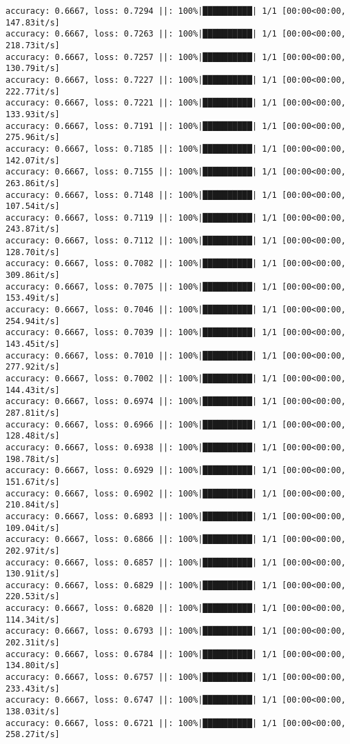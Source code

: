 \documentclass[
]{article}
\begin{document}
\begin{verbatim}
accuracy: 0.6667, loss: 0.7294 ||: 100%|██████████| 1/1 [00:00<00:00, 147.83it/s]
accuracy: 0.6667, loss: 0.7263 ||: 100%|██████████| 1/1 [00:00<00:00, 218.73it/s]
accuracy: 0.6667, loss: 0.7257 ||: 100%|██████████| 1/1 [00:00<00:00, 130.79it/s]
accuracy: 0.6667, loss: 0.7227 ||: 100%|██████████| 1/1 [00:00<00:00, 222.77it/s]
accuracy: 0.6667, loss: 0.7221 ||: 100%|██████████| 1/1 [00:00<00:00, 133.93it/s]
accuracy: 0.6667, loss: 0.7191 ||: 100%|██████████| 1/1 [00:00<00:00, 275.96it/s]
accuracy: 0.6667, loss: 0.7185 ||: 100%|██████████| 1/1 [00:00<00:00, 142.07it/s]
accuracy: 0.6667, loss: 0.7155 ||: 100%|██████████| 1/1 [00:00<00:00, 263.86it/s]
accuracy: 0.6667, loss: 0.7148 ||: 100%|██████████| 1/1 [00:00<00:00, 107.54it/s]
accuracy: 0.6667, loss: 0.7119 ||: 100%|██████████| 1/1 [00:00<00:00, 243.87it/s]
accuracy: 0.6667, loss: 0.7112 ||: 100%|██████████| 1/1 [00:00<00:00, 128.70it/s]
accuracy: 0.6667, loss: 0.7082 ||: 100%|██████████| 1/1 [00:00<00:00, 309.86it/s]
accuracy: 0.6667, loss: 0.7075 ||: 100%|██████████| 1/1 [00:00<00:00, 153.49it/s]
accuracy: 0.6667, loss: 0.7046 ||: 100%|██████████| 1/1 [00:00<00:00, 254.94it/s]
accuracy: 0.6667, loss: 0.7039 ||: 100%|██████████| 1/1 [00:00<00:00, 143.45it/s]
accuracy: 0.6667, loss: 0.7010 ||: 100%|██████████| 1/1 [00:00<00:00, 277.92it/s]
accuracy: 0.6667, loss: 0.7002 ||: 100%|██████████| 1/1 [00:00<00:00, 144.43it/s]
accuracy: 0.6667, loss: 0.6974 ||: 100%|██████████| 1/1 [00:00<00:00, 287.81it/s]
accuracy: 0.6667, loss: 0.6966 ||: 100%|██████████| 1/1 [00:00<00:00, 128.48it/s]
accuracy: 0.6667, loss: 0.6938 ||: 100%|██████████| 1/1 [00:00<00:00, 198.78it/s]
accuracy: 0.6667, loss: 0.6929 ||: 100%|██████████| 1/1 [00:00<00:00, 151.67it/s]
accuracy: 0.6667, loss: 0.6902 ||: 100%|██████████| 1/1 [00:00<00:00, 210.84it/s]
accuracy: 0.6667, loss: 0.6893 ||: 100%|██████████| 1/1 [00:00<00:00, 109.04it/s]
accuracy: 0.6667, loss: 0.6866 ||: 100%|██████████| 1/1 [00:00<00:00, 202.97it/s]
accuracy: 0.6667, loss: 0.6857 ||: 100%|██████████| 1/1 [00:00<00:00, 130.91it/s]
accuracy: 0.6667, loss: 0.6829 ||: 100%|██████████| 1/1 [00:00<00:00, 220.53it/s]
accuracy: 0.6667, loss: 0.6820 ||: 100%|██████████| 1/1 [00:00<00:00, 114.34it/s]
accuracy: 0.6667, loss: 0.6793 ||: 100%|██████████| 1/1 [00:00<00:00, 202.31it/s]
accuracy: 0.6667, loss: 0.6784 ||: 100%|██████████| 1/1 [00:00<00:00, 134.80it/s]
accuracy: 0.6667, loss: 0.6757 ||: 100%|██████████| 1/1 [00:00<00:00, 233.43it/s]
accuracy: 0.6667, loss: 0.6747 ||: 100%|██████████| 1/1 [00:00<00:00, 138.03it/s]
accuracy: 0.6667, loss: 0.6721 ||: 100%|██████████| 1/1 [00:00<00:00, 258.27it/s]

\end{verbatim}
\end{document}
